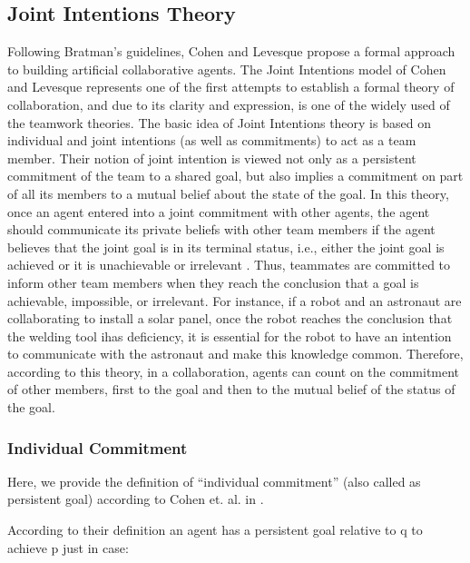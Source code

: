 \documentclass[11pt]{article}
\begin{document}
\subsection{Joint Intentions Theory}
\label{sec:joint-intentions}

Following Bratman's guidelines, Cohen and Levesque propose a formal approach to
building artificial collaborative agents. The Joint Intentions model of Cohen
and Levesque \cite{cohen:teamwork, cohen:intention-commitment,
cohen:persistence-intention-commitment, cohen:intentions,
levesque:acting-together} represents one of the first attempts to establish a
formal theory of collaboration, and due to its clarity and expression, is one of
the widely used of the teamwork theories. The basic idea of Joint Intentions
theory is based on individual and joint intentions (as well as commitments) to
act as a team member. Their notion of joint intention is viewed not only as a
persistent commitment of the team to a shared goal, but also implies a
commitment on part of all its members to a mutual belief about the state of the
goal. In this theory, once an agent entered into a joint commitment with other
agents, the agent should communicate its private beliefs with other team members
if the agent believes that the joint goal is in its terminal status, i.e.,
either the joint goal is achieved or it is unachievable or irrelevant
\cite{wilsker:study-theories}. Thus, teammates are committed to inform other
team members when they reach the conclusion that a goal is achievable,
impossible, or irrelevant. For instance, if a robot and an astronaut are
collaborating to install a solar panel, once the robot reaches the conclusion
that the welding tool ihas deficiency, it is essential for the robot to have an
intention to communicate with the astronaut and make this knowledge common.
Therefore, according to this theory, in a collaboration, agents can count on the
commitment of other members, first to the goal and then to the mutual belief of
the status of the goal.

\subsubsection{Individual Commitment}

Here, we provide the definition of ``individual commitment'' (also called
as persistent goal) according to Cohen et. al. in \cite{cohen:team-formation}. 

According to their definition an agent has a persistent goal relative to q to
achieve p just in case:
\end{document}
